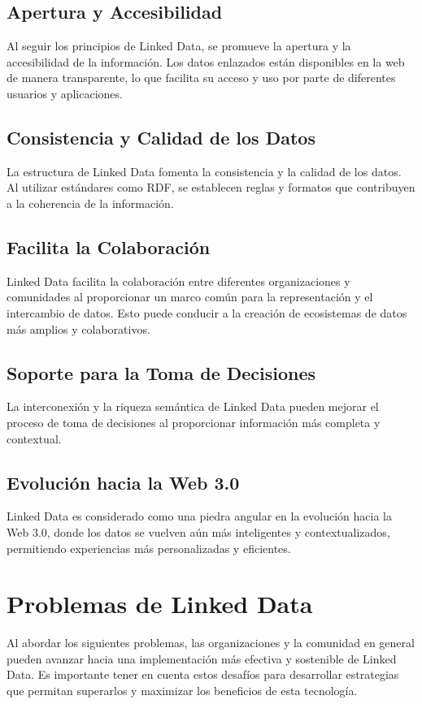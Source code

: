\documentclass[11pt]{report}
\begin{document}
\section{Apertura y Accesibilidad}

		Al seguir los principios de Linked Data, se promueve la apertura y la accesibilidad de la información. Los datos enlazados están disponibles en la web de manera transparente, lo que facilita su acceso y uso por parte de diferentes usuarios y aplicaciones.
\section{Consistencia y Calidad de los Datos}

		La estructura de Linked Data fomenta la consistencia y la calidad de los datos. Al utilizar estándares como RDF, se establecen reglas y formatos que contribuyen a la coherencia de la información.
\section{Facilita la Colaboración}

		Linked Data facilita la colaboración entre diferentes organizaciones y comunidades al proporcionar un marco común para la representación y el intercambio de datos. Esto puede conducir a la creación de ecosistemas de datos más amplios y colaborativos.
\section{Soporte para la Toma de Decisiones}

		La interconexión y la riqueza semántica de Linked Data pueden mejorar el proceso de toma de decisiones al proporcionar información más completa y contextual.
\section{Evolución hacia la Web 3.0}

		Linked Data es considerado como una piedra angular en la evolución hacia la Web 3.0, donde los datos se vuelven aún más inteligentes y contextualizados, permitiendo experiencias más personalizadas y eficientes.

\chapter{Problemas de Linked Data}
Al abordar los siguientes problemas, las organizaciones y la comunidad en general pueden avanzar hacia una implementación más efectiva y sostenible de Linked Data. Es importante tener en cuenta estos desafíos para desarrollar estrategias que permitan superarlos y maximizar los beneficios de esta tecnología.
\end{document}
